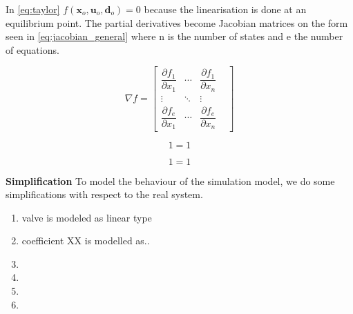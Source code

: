 In \cref{eq:taylor} $f(\textbf{x}_o, \textbf{u}_o, \textbf{d}_o) = 0$ because the linearisation is done at an equilibrium point. The partial derivatives become Jacobian matrices on the form seen in \cref{eq:jacobian_general} where n is the number of states and e the number of equations.

\begin{equation} \label{eq:jacobian_general}
	\nabla f = 	\begin{bmatrix}
					\dfrac{\partial f_1}{\partial x_1} & \cdots & \dfrac{\partial f_1}{\partial x_n} & \\
					\vdots & \ddots & \vdots & \\
					\dfrac{\partial f_e}{\partial x_1} & \cdots & \dfrac{\partial f_e}{\partial x_n} &
				\end{bmatrix}
\end{equation}



\begin{equation} \label{eq:}
	1=1
\end{equation}

\begin{equation} \label{eq:}
	1=1
\end{equation}


\textbf{Simplification}
To model the behaviour of the simulation model, we do some simplifications with respect to the real system. 
\begin{enumerate}
	\item valve is modeled as linear type
	\item coefficient XX is modelled as..
	\item
	\item
	\item
	\item
	
\end{enumerate}